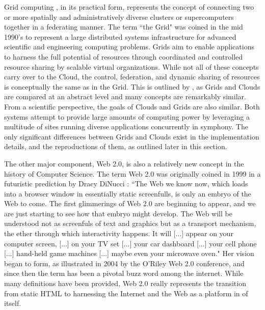 Grid computing \cite{foster2001a, foster2002b}, in its practical form, represents the concept of connecting two or more spatially and administratively diverse clusters or supercomputers together in a federating manner.  The term ``the Grid" was coined in the mid 1990's to represent a large distributed systems infrastructure for advanced scientific and engineering computing problems. Grids aim to enable applications to harness the full potential of resources through coordinated and controlled resource sharing by scalable virtual organizations.  While not all of these concepts carry over to the Cloud, the control, federation, and dynamic sharing of resources is conceptually the same as in the Grid.  This is outlined by \cite{foster2008cca}, as Grids and Clouds are compared at an abstract level and many concepts are remarkably similar.  From a scientific perspective, the goals of Clouds and Grids are also similar.  Both systems attempt to provide large amounts of computing power by leveraging a multitude of sites running diverse applications concurrently in symphony.  The only significant differences between Grids and Clouds exist in the implementation details, and the reproductions of them, as outlined later in this section.

The other major component, Web 2.0, is also a relatively new concept in the history of Computer Science.  The term Web 2.0 was originally coined in 1999 in a futuristic prediction by Dracy DiNucci \cite{dinucci1999fragmented}: ``The Web we know now, which loads into a browser window in essentially static screenfulls, is only an embryo of the Web to come. The first glimmerings of Web 2.0 are beginning to appear, and we are just starting to see how that embryo might develop. The Web will be understood not as screenfuls of text and graphics but as a transport mechanism, the ether through which interactivity happens. It will [...] appear on your computer screen, [...] on your TV set [...] your car dashboard [...] your cell phone [...] hand-held game machines [...] maybe even your microwave oven."  Her vision began to form, as illustrated in 2004 by the O'Riley Web 2.0 conference, and since then the term has been a pivotal buzz word among the internet.  While many definitions have been provided, Web 2.0 really represents the transition from static HTML to harnessing the Internet and the Web as a platform in of itself.  

